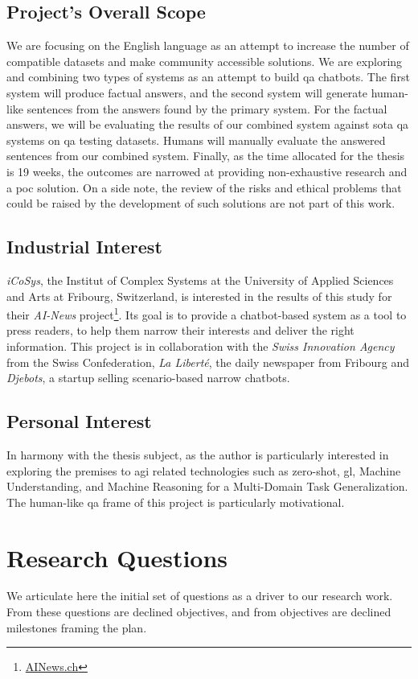 \subsection{Project's Overall Scope}
We are focusing on the English language as an attempt to increase the number of compatible datasets and make community accessible solutions. We are exploring and combining two types of systems as an attempt to build \gls{qa} chatbots. The first system will produce factual answers, and the second system will generate human-like sentences from the answers found by the primary system. For the factual answers, we will be evaluating the results of our combined system against \gls{sota} \gls{qa} systems on \gls{qa} testing datasets. Humans will manually evaluate the answered sentences from our combined system. Finally, as the time allocated for the thesis is 19 weeks, the outcomes are narrowed at providing non-exhaustive research and a \gls{poc} solution. On a side note, the review of the risks and ethical problems that could be raised by the development of such solutions are not part of this work.


\subsection{Industrial Interest}
\textit{iCoSys}, the Institut of Complex Systems at the University of Applied Sciences and Arts at Fribourg, Switzerland, is interested in the results of this study for their \textit{AI-News} project\footnote{\url{AINews.ch}}. Its goal is to provide a chatbot-based system as a tool to press readers, to help them narrow their interests and deliver the right information. This project is in collaboration with the \textit{Swiss Innovation Agency} from the Swiss Confederation, \textit{La Liberté}, the daily newspaper from Fribourg and \textit{Djebots}, a startup selling scenario-based narrow chatbots.

\subsection{Personal Interest}
In harmony with the thesis subject, as the author is particularly interested in exploring the premises to \gls{agi} related technologies such as \gls{zero-shot}, \gls{gl}, Machine Understanding, and Machine Reasoning for a Multi-Domain Task Generalization. The human-like \gls{qa} frame of this project is particularly motivational.

\section{Research Questions}
We articulate here the initial set of questions as a driver to our research work. From these questions are declined objectives, and from objectives are declined milestones framing the plan.

